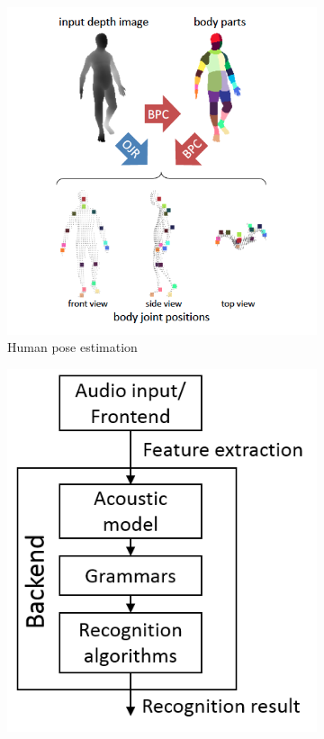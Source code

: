 \begin{figure}
\centering
\begin{subfigure}[t]{0.48\textwidth}
\includegraphics[width=\textwidth]{assets/kinect_approaches.png}
\caption[Human pose estimation]{Human pose estimation \cite{shotton2013efficient}}
\label{fig:kinect_pose}
\end{subfigure}
\begin{subfigure}[t]{0.48\textwidth}
\includegraphics[width=\textwidth]{assets/speech_recognition.png}

\end{subfigure}
\end{figure}
